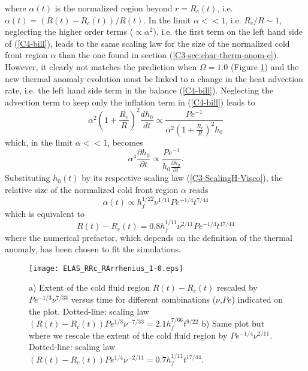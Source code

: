 where $\alpha  (t)$ is the  normalized region beyond  $r=R_c(t)$, i.e.
$\alpha(t)= \left(R(t)-R_c(t)\right)/R(t)$. In  the limit $\alpha<<1$,
i.e.    $R_c/R\sim    1$,   neglecting   the   higher    order   terms
($\propto \alpha^2$),  i.e. the first  term on  the left hand  side of
(\ref{C4-bill}), leads  to the same  scaling law  for the size  of the
normalized cold  front region $\alpha$  than the one found  in section
(\ref{C3-sec:char-therm-anom-e}). However, it  clearly not matches the
prediction when $\Omega=1.0$ (Figure \ref{C4-ELAS_RRc_RArrhenius_1-0})
and the  new thermal anomaly evolution  must be linked to  a change in
the heat advection rate, i.e.  the  left hand side term in the balance
(\ref{C4-bill}).   Neglecting  the advection  term  to  keep only  the
inflation term in (\ref{C4-bill}) leads to
\begin{equation}
  \alpha^2\left(1+\frac{R_c}{R}\right)^2\frac{d h_0}{d
    t}\propto \frac{Pe^{-1}}{\alpha^2\left(1+\frac{R_c}{R}\right)^2h_0}
\end{equation}
which, in the limit $\alpha<<1$, becomes
\begin{equation}
  \alpha^4\frac{\partial h_0}{\partial
    t} \propto \frac{Pe^{-1}}{h_0\frac{\partial h_0}{\partial t}}.
\end{equation}
Substituting    $h_0(t)$    by     its    respective    scaling    law
(\ref{C3-ScalingH-Visco}), the  relative size  of the  normalized cold
front region $\alpha$ reads
\begin{equation}
  \alpha(t) \propto h_f^{1/22}\nu^{1/11}Pe^{-1/4}t^{7/44}
\end{equation}
which is equivalent to
\begin{equation}
  R(t)-R_c(t) = 0.8h_f^{1/11}\nu^{2/11}Pe^{-1/4}t^{17/44}
  \label{C4-ScalingRRc-Heating}
\end{equation}
where the numerical prefactor, which  depends on the definition of the
thermal anomaly, has been chosen to fit the simulations.

\begin{figure}
  \begin{center}
    \graphicspath{ {/Users/thorey/Documents/These/Projet/Refroidissement/Skin_Model/Figure/Figure_Heating/} }
    \texttt{[image: ELAS\_RRc\_RArrhenius\_1-0.eps]}
    \caption{a) Extent of the cold fluid region $R(t)-R_c(t)$ rescaled
      by $Pe^{-1/3}\nu^{7/33}$ versus  time for different combinations
      ($\nu$,$Pe$) indicated  on the  plot.  Dotted-line:  scaling law
      $(R(t)-R_c(t))Pe^{1/3}\nu^{-7/33}=  2.1  h_f^{7/66}t^{9/22}$  b)
      Same plot  but where  we rescale  the extent  of the  cold fluid
      region  by  $Pe^{-1/4}\nu^{2/11}$.    Dotted-line:  scaling  law
      $(R(t)-R_c(t))Pe^{1/4}\nu^{-2/11}= 0.7 h_f^{1/11}t^{17/44}$.}
    \label{C4-ELAS_RRc_RArrhenius_1-0}
  \end{center}
\end{figure}

